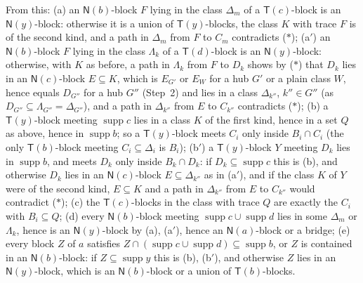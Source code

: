 \documentclass[11pt]{amsart}
\theoremstyle{definition}
\newcommand{\supp}{\operatorname{supp}}
\newcommand{\T}{\mathsf{T}}
\newcommand{\N}{\mathsf{N}}
\begin{document}
From this: (a) an $\N(b)$-block $F$ lying in the class $\Delta_m$ of a $\T(c)$-block is an $\N(y)$-block: otherwise it is a union of $\T(y)$-blocks, the class $K$ with trace $F$ is of the second kind, and a path in $\Delta_m$ from $F$ to $C_m$ contradicts ($*$); (a$'$) an $\N(b)$-block $F$ lying in the class $\Lambda_k$ of a $\T(d)$-block is an $\N(y)$-block: otherwise, with $K$ as before, a path in $\Lambda_k$ from $F$ to $D_k$ shows by ($*$) that $D_k$ lies in an $\N(c)$-block $E\subseteq K$, which is $E_{G'}$ or $E_W$ for a hub $G'$ or a plain class $W$, hence equals $D_{G''}$ for a hub $G''$ (Step~2) and lies in a class $\Delta_{k''}$, $k''\in G''$ (as $D_{G''}\subseteq\Lambda_{G''}=\Delta_{G''}$), and a path in $\Delta_{k''}$ from $E$ to $C_{k''}$ contradicts ($*$); (b) a $\T(y)$-block meeting $\supp c$ lies in a class $K$ of the first kind, hence in a set $Q$ as above, hence in $\supp b$; so a $\T(y)$-block meets $C_i$ only inside $B_i\cap C_i$ (the only $\T(b)$-block meeting $C_i\subseteq\Delta_i$ is $B_i$); (b$'$) a $\T(y)$-block $Y$ meeting $D_k$ lies in $\supp b$, and meets $D_k$ only inside $B_k\cap D_k$: if $D_k\subseteq\supp c$ this is (b), and otherwise $D_k$ lies in an $\N(c)$-block $E\subseteq\Delta_{k''}$ as in (a$'$), and if the class $K$ of $Y$ were of the second kind, $E\subseteq K$ and a path in $\Delta_{k''}$ from $E$ to $C_{k''}$ would contradict ($*$); (c) the $\T(c)$-blocks in the class with trace $Q$ are exactly the $C_i$ with $B_i\subseteq Q$; (d) every $\N(b)$-block meeting $\supp c\cup\supp d$ lies in some $\Delta_m$ or $\Lambda_k$, hence is an $\N(y)$-block by (a), (a$'$), hence an $\N(a)$-block or a bridge; (e) every block $Z$ of $a$ satisfies $Z\cap(\supp c\cup\supp d)\subseteq\supp b$, or $Z$ is contained in an $\N(b)$-block: if $Z\subseteq\supp y$ this is (b), (b$'$), and otherwise $Z$ lies in an $\N(y)$-block, which is an $\N(b)$-block or a union of $\T(b)$-blocks.
\end{document}
